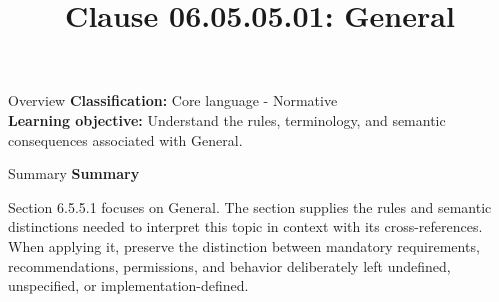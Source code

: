 \documentclass[10pt,letterpaper]{article}
\title{Clause 06.05.05.01: General}
\author{}
\date{}
\begin{document}
\maketitle
\begin{CornellOverviewBox}{Overview}
\textbf{Classification:} Core language - Normative\\[2pt]
\textbf{Learning objective:} Understand the rules, terminology, and semantic consequences associated with General.
\end{CornellOverviewBox}\begin{CornellSummaryBox}{Summary}
{\sffamily\bfseries\color{Accent} Summary}\par\vspace{3pt}Section 6.5.5.1 focuses on General. The section supplies the rules and semantic distinctions needed to interpret this topic in context with its cross-references. When applying it, preserve the distinction between mandatory requirements, recommendations, permissions, and behavior deliberately left undefined, unspecified, or implementation-defined.
\end{CornellSummaryBox}
\end{document}
